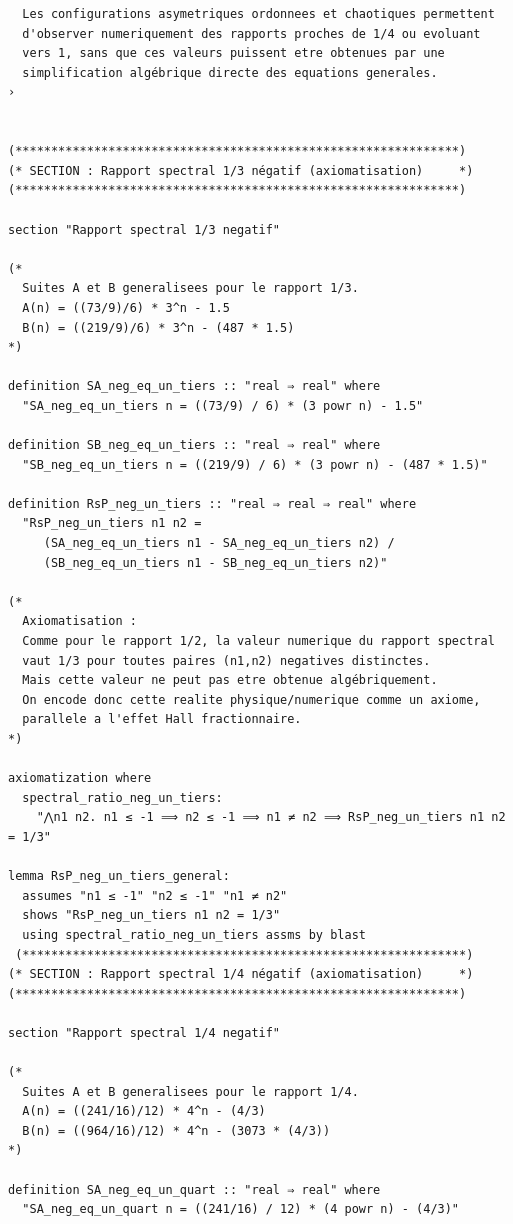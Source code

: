 \documentclass[a4paper,11pt]{article}
\begin{document}
\begin{holcode}[title={\textcolor{white}{File: methode\_spectral.thy -- Part 1/4}}]
\begin{lstlisting}
  Les configurations asymetriques ordonnees et chaotiques permettent
  d'observer numeriquement des rapports proches de 1/4 ou evoluant
  vers 1, sans que ces valeurs puissent etre obtenues par une
  simplification algébrique directe des equations generales.
›


(**************************************************************)
(* SECTION : Rapport spectral 1/3 négatif (axiomatisation)     *)
(**************************************************************)

section "Rapport spectral 1/3 negatif"

(*
  Suites A et B generalisees pour le rapport 1/3.
  A(n) = ((73/9)/6) * 3^n - 1.5
  B(n) = ((219/9)/6) * 3^n - (487 * 1.5)
*)

definition SA_neg_eq_un_tiers :: "real ⇒ real" where
  "SA_neg_eq_un_tiers n = ((73/9) / 6) * (3 powr n) - 1.5"

definition SB_neg_eq_un_tiers :: "real ⇒ real" where
  "SB_neg_eq_un_tiers n = ((219/9) / 6) * (3 powr n) - (487 * 1.5)"

definition RsP_neg_un_tiers :: "real ⇒ real ⇒ real" where
  "RsP_neg_un_tiers n1 n2 =
     (SA_neg_eq_un_tiers n1 - SA_neg_eq_un_tiers n2) /
     (SB_neg_eq_un_tiers n1 - SB_neg_eq_un_tiers n2)"

(*
  Axiomatisation :
  Comme pour le rapport 1/2, la valeur numerique du rapport spectral
  vaut 1/3 pour toutes paires (n1,n2) negatives distinctes.
  Mais cette valeur ne peut pas etre obtenue algébriquement.
  On encode donc cette realite physique/numerique comme un axiome,
  parallele a l'effet Hall fractionnaire.
*)

axiomatization where
  spectral_ratio_neg_un_tiers:
    "⋀n1 n2. n1 ≤ -1 ⟹ n2 ≤ -1 ⟹ n1 ≠ n2 ⟹ RsP_neg_un_tiers n1 n2 = 1/3"

lemma RsP_neg_un_tiers_general:
  assumes "n1 ≤ -1" "n2 ≤ -1" "n1 ≠ n2"
  shows "RsP_neg_un_tiers n1 n2 = 1/3"
  using spectral_ratio_neg_un_tiers assms by blast
 (**************************************************************)
(* SECTION : Rapport spectral 1/4 négatif (axiomatisation)     *)
(**************************************************************)

section "Rapport spectral 1/4 negatif"

(*
  Suites A et B generalisees pour le rapport 1/4.
  A(n) = ((241/16)/12) * 4^n - (4/3)
  B(n) = ((964/16)/12) * 4^n - (3073 * (4/3))
*)

definition SA_neg_eq_un_quart :: "real ⇒ real" where
  "SA_neg_eq_un_quart n = ((241/16) / 12) * (4 powr n) - (4/3)"


\end{lstlisting}
\end{holcode}
\end{document}
